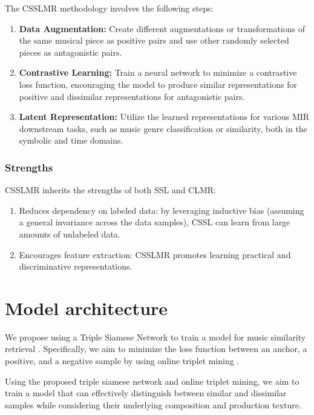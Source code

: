 The CSSLMR methodology involves the following steps:

\begin{enumerate}
\item \textbf{Data Augmentation:} Create different augmentations or transformations of the same musical piece as positive pairs and use other randomly selected pieces as antagonistic pairs.
\item \textbf{Contrastive Learning:} Train a neural network to minimize a contrastive loss function, encouraging the model to produce similar representations for positive and dissimilar representations for antagonistic pairs.
\item\textbf{Latent Representation:} Utilize the learned representations for various MIR downstream tasks, such as music genre classification or similarity, both in the symbolic and time domains.
\end{enumerate} 

\subsubsection{Strengths}

CSSLMR inherits the strengths of both SSL and CLMR:

\begin{enumerate}
\item Reduces dependency on labeled data: by leveraging inductive bias (assuming a general invariance across the data samples), CSSL can learn from large amounts of unlabeled data.
\item Encourages feature extraction: CSSLMR promotes learning practical and discriminative representations.
\end{enumerate} 

\section{Model architecture}

We propose using a Triple Siamese Network to train a model for music similarity retrieval \cite{contentmusicsimtriplet2020}. Specifically, we aim to minimize the loss function between an anchor, a positive, and a negative sample by using online triplet mining \cite{Sikaroudi2020OfflinePatches}.

Using the proposed triple siamese network and online triplet mining, we aim to train a model that can effectively distinguish between similar and dissimilar samples while considering their underlying composition and production texture.


